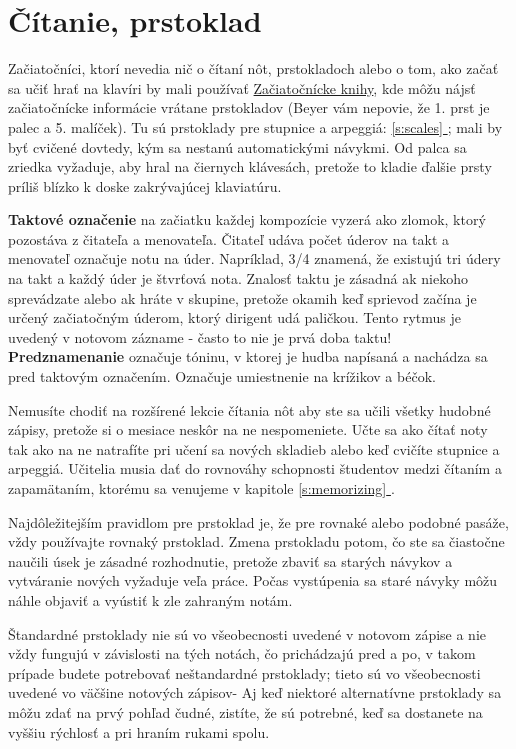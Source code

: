 \documentclass[11pt,a4paper]{book}
\newcommand*{\fullref}[1]{\hyperref[{#1}]{\ref*{#1} \nameref*{#1}}} %
\begin{document}
\section{Čítanie, prstoklad}\label{s:reading-fingering}
Začiatočníci, ktorí nevedia nič o čítaní nôt, prstokladoch alebo o tom, ako začať sa učiť hrať na klavíri by mali používať \hyperlink{r:beginner-books}{Začiatočnícke knihy}, kde môžu nájsť začiatočnícke informácie vrátane prstokladov (Beyer vám nepovie, že 1. prst je palec a 5. malíček). Tu sú prstoklady pre stupnice a arpeggiá: \fullref{s:scales}; mali by byť cvičené dovtedy, kým sa nestanú automatickými návykmi. Od palca sa zriedka vyžaduje, aby hral na čiernych klávesách, pretože to kladie ďalšie prsty príliš blízko k doske zakrývajúcej klaviatúru.

\textbf{Taktové označenie} na začiatku každej kompozície vyzerá ako zlomok, ktorý pozostáva z čitateľa a menovateľa. Čitateľ udáva počet úderov na takt a menovateľ označuje notu na úder. Napríklad, 3/4 znamená, že existujú tri údery na takt a každý úder je štvrťová nota. Znalosť taktu je zásadná ak niekoho sprevádzate alebo ak hráte v skupine, pretože okamih keď sprievod začína je určený začiatočným úderom, ktorý dirigent udá paličkou. Tento rytmus je uvedený v notovom zázname - často to nie je prvá doba taktu! \textbf{Predznamenanie} označuje tóninu, v ktorej je hudba napísaná a nachádza sa pred taktovým označením. Označuje umiestnenie na krížikov a béčok.

Nemusíte chodiť na rozšírené lekcie čítania nôt aby ste sa učili všetky hudobné zápisy, pretože si o mesiace neskôr na ne nespomeniete. Učte sa ako čítať noty tak ako na ne natrafíte pri učení sa nových skladieb alebo keď cvičíte stupnice a arpeggiá. Učitelia musia dať do rovnováhy schopnosti študentov medzi čítaním a zapamätaním, ktorému sa venujeme v kapitole \fullref{s:memorizing}.

Najdôležitejším pravidlom pre prstoklad je, že pre rovnaké alebo podobné pasáže, vždy používajte rovnaký prstoklad. Zmena prstokladu potom, čo ste sa čiastočne naučili úsek je zásadné rozhodnutie, pretože zbaviť sa starých návykov a vytváranie nových vyžaduje veľa práce. Počas vystúpenia sa staré návyky môžu náhle objaviť a vyústiť k zle zahraným notám.

Štandardné prstoklady nie sú vo všeobecnosti uvedené v notovom zápise a nie vždy fungujú v závislosti na tých notách, čo prichádzajú pred a po, v takom prípade budete potrebovať neštandardné prstoklady; tieto sú vo všeobecnosti uvedené vo väčšine notových zápisov- Aj keď niektoré alternatívne prstoklady  sa môžu zdať na prvý pohľad čudné, zistíte, že sú potrebné, keď sa dostanete na vyššiu rýchlosť a pri hraním rukami spolu.
\end{document}
